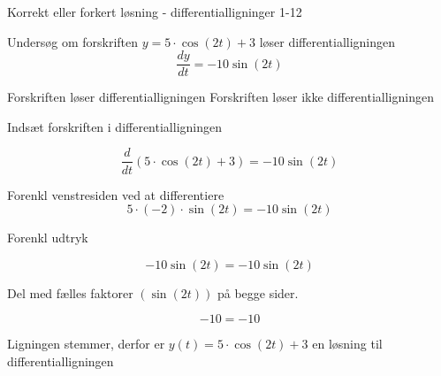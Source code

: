 \documentclass{article}
\begin{document}
\begin{exercise}{Korrekt eller forkert løsning - differentialligninger 1-12}


Undersøg om forskriften $y = 5 \cdot \cos(2t) + 3$ løser differentialligningen
\[
\frac{dy}{dt} = -10 \sin(2t)
\]

\begin{multichoice}
\itemtrue Forskriften løser differentialligningen
\itemfalse Forskriften løser ikke differentialligningen
\end{multichoice}

\hint

Indsæt forskriften i differentialligningen

\hint
\[
\frac{d}{dt} \left(5 \cdot \cos(2t) + 3\right) = -10 \sin(2t)
\]


\hint

Forenkl venstresiden ved at differentiere
\[
5 \cdot (-2) \cdot \sin(2t) = -10 \sin(2t)
\]

\hint

Forenkl udtryk

\hint
\[
-10 \sin(2t) = -10 \sin(2t)
\]

\hint
Del med fælles faktorer $\left( \sin(2t) \right)$ på begge sider.

\hint

\[
-10 = -10
\]


\hint

Ligningen stemmer, derfor er $y(t) = 5 \cdot \cos(2t) + 3$ en løsning til differentialligningen

\end{exercise}
\end{document}
